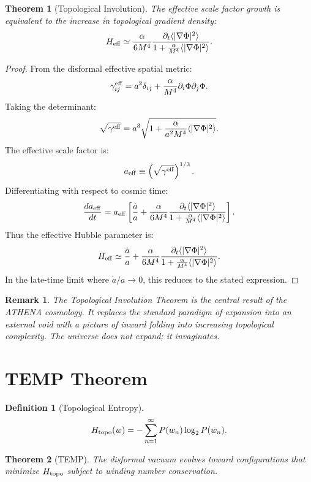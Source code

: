 \documentclass[12pt,oneside]{book}
\newtheorem{definition}{Definition}[chapter]
\newtheorem{theorem}{Theorem}[chapter]
\newtheorem{remark}{Remark}[chapter]
\begin{document}
\begin{theorem}[Topological Involution]
The effective scale factor growth is equivalent to the increase in topological gradient density:
\[
H_{\rm eff} \simeq \frac{\alpha}{6M^4} \frac{\partial_t \langle|\nabla\Phi|^2\rangle}{1 + \frac{\alpha}{M^4}\langle|\nabla\Phi|^2\rangle}.
\]
\end{theorem}

\begin{proof}
From the disformal effective spatial metric:
\[
\gamma_{ij}^{\rm eff} = a^2\delta_{ij} + \frac{\alpha}{M^4}\partial_i\Phi\partial_j\Phi.
\]
Taking the determinant:
\[
\sqrt{\gamma^{\rm eff}} = a^3 \sqrt{1 + \frac{\alpha}{a^2 M^4}\langle|\nabla\Phi|^2\rangle}.
\]
The effective scale factor is:
\[
a_{\rm eff} \equiv \left(\sqrt{\gamma^{\rm eff}}\right)^{1/3}.
\]
Differentiating with respect to cosmic time:
\[
\frac{da_{\rm eff}}{dt} = a_{\rm eff} \left[\frac{\dot{a}}{a} + \frac{\alpha}{6M^4} \frac{\partial_t \langle|\nabla\Phi|^2\rangle}{1 + \frac{\alpha}{M^4}\langle|\nabla\Phi|^2\rangle}\right].
\]
Thus the effective Hubble parameter is:
\[
H_{\rm eff} \simeq \frac{\dot{a}}{a} + \frac{\alpha}{6M^4} \frac{\partial_t \langle|\nabla\Phi|^2\rangle}{1 + \frac{\alpha}{M^4}\langle|\nabla\Phi|^2\rangle}.
\]
In the late-time limit where $\dot{a}/a \to 0$, this reduces to the stated expression.
\end{proof}

\begin{remark}
The Topological Involution Theorem is the central result of the ATHENA cosmology. It replaces the standard paradigm of expansion into an external void with a picture of inward folding into increasing topological complexity. The universe does not expand; it invaginates.
\end{remark}

\section{TEMP Theorem}

\begin{definition}[Topological Entropy]
\[
H_{\rm topo}(w) = -\sum_{n=1}^\infty P(w_n) \log_2 P(w_n).
\]
\end{definition}

\begin{theorem}[TEMP]
The disformal vacuum evolves toward configurations that minimize $H_{\rm topo}$ subject to winding number conservation.
\end{theorem}
\end{document}
